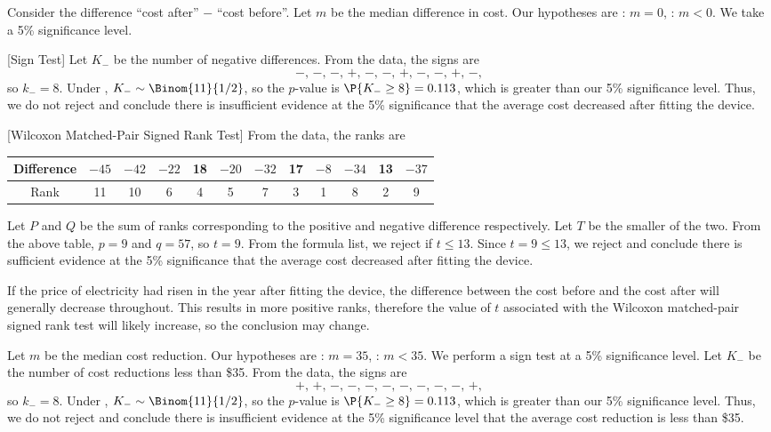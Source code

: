 \begin{solution}
    Consider the difference ``cost after'' $-$ ``cost before''. Let $m$ be the median difference in cost. Our hypotheses are \nullhyp: $m = 0$, \althyp: $m < 0$. We take a 5\% significance level.

    [Sign Test] Let $K_-$ be the number of negative differences. From the data, the signs are \[-, \, -, \, -, \, +, \, -, \, -, \, +, \, -, \, -, \, +, \, -,\] so $k_- = 8$. Under \nullhyp, $K_- \sim \Binom{11}{1/2}$, so the $p$-value is $\P{K_- \geq 8} = 0.113$, which is greater than our 5\% significance level. Thus, we do not reject \nullhyp{} and conclude there is insufficient evidence at the 5\% significance that the average cost decreased after fitting the device.

    [Wilcoxon Matched-Pair Signed Rank Test] From the data, the ranks are
    \begin{table}[H]
        \centering
        \begin{tabular}{|c|c|c|c|c|c|c|c|c|c|c|c|}
        \hline
        Difference & $-45$ & $-42$ & $-22$ & 18 & $-20$ & $-32$ & 17 & $-8$ & $-34$ & 13 & $-37$ \\ \hline
        Rank & 11 & 10 & 6 & 4 & 5 & 7 & 3 & 1 & 8 & 2 & 9 \\ \hline
        \end{tabular}
    \end{table}
    Let $P$ and $Q$ be the sum of ranks corresponding to the positive and negative difference respectively. Let $T$ be the smaller of the two. From the above table, $p = 9$ and $q = 57$, so $t = 9$. From the formula list, we reject \nullhyp if $t \leq 13$. Since $t = 9 \leq 13$, we reject \nullhyp{} and conclude there is sufficient evidence at the 5\% significance that the average cost decreased after fitting the device.

    If the price of electricity had risen in the year after fitting the device, the difference between the cost before and the cost after will generally decrease throughout. This results in more positive ranks, therefore the value of $t$ associated with the Wilcoxon matched-pair signed rank test will likely increase, so the conclusion may change.

    Let $m$ be the median cost reduction. Our hypotheses are \nullhyp: $m = 35$, \althyp: $m < 35$. We perform a sign test at a 5\% significance level. Let $K_-$ be the number of cost reductions less than \$35. From the data, the signs are \[+, \, +, \, -, \, -, \, -, \, -, \, -, \, -, \, -, \, -, \, +,\] so $k_- = 8$. Under \nullhyp, $K_- \sim \Binom{11}{1/2}$, so the $p$-value is $\P{K_- \geq 8} = 0.113$, which is greater than our 5\% significance level. Thus, we do not reject \nullhyp{} and conclude there is insufficient evidence at the 5\% significance level that the average cost reduction is less than \$35.
\end{solution}